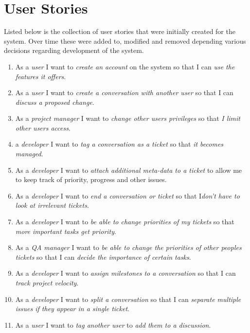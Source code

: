 \documentclass[a4paper]{l3proj}
\begin{document}
\section{User Stories}
\label{userStories}

Listed below is the collection of user stories that were initially created for the system.  Over time these were added to, modified and removed depending various decisions regarding development of the system.

\begin{enumerate}[ref=\arabic*]
\item As a \textit{user} I want to \textit{create an account} on the system so that I can \textit{use the features it offers}. \label{item:1}
\item As a \textit{user} I want to \textit{create a conversation with another user} so that I can \textit{discuss a proposed change}. \label{item:2}
\item As a \textit{project manager} I want to \textit{change other users privileges} so that \textit{I limit other users access}. \label{item:3}
\item  a \textit{developer} I want to \textit{tag a conversation as a ticket} so that \textit{it becomes managed}.\label{item:4}
\item As a \textit{developer} I want to \textit{attach additional meta-data to a ticket} to allow me to keep track of priority, progress and other issues.\label{item:5}
\item As a \textit{developer} I want to \textit{end a conversation or ticket} so that I\textit{don't have to look at irrelevant tickets}.\label{item6}
\item As a \textit{developer} I want to \textit{be able to change priorities of my tickets} so that \textit{more important tasks get priority}.\label{item:7}
\item As a \textit{QA manager} I want to \textit{be able to change the priorities of other peoples tickets} so that I can \textit{decide the importance of certain tasks}.\label{item:8}
\item As a \textit{developer} I want to \textit{assign milestones to a conversation} so that I can \textit{track project velocity}.\label{item:9}
\item As a \textit{developer} I want to \textit{split a conversation} so that I can \textit{separate multiple issues if they appear in a single ticket}.\label{item:10}
\item As a \textit{user} I want to \textit{tag another user} to \textit{add them to a discussion}.\label{item:11}

\end{enumerate}
\end{document}
